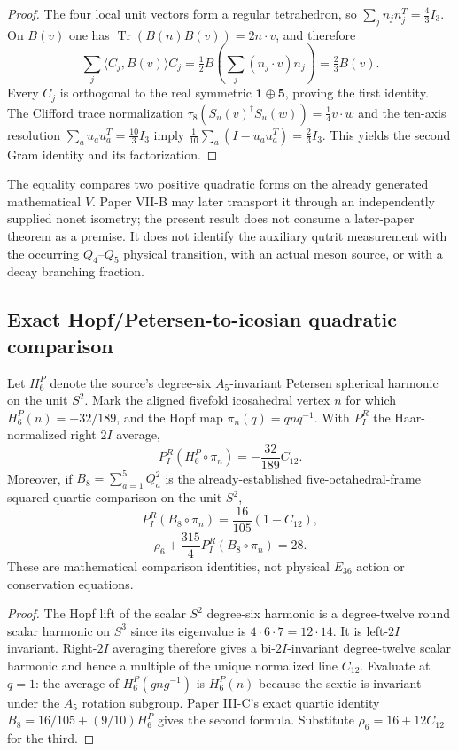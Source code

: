 \documentclass[12pt,a4paper]{article}
\begin{document}
\begin{proof}
The four local unit vectors form a regular tetrahedron, so
$\sum_jn_jn_j^T=\tfrac43I_3$. On $B(v)$ one has
$\operatorname{Tr}(B(n)B(v))=2n\cdot v$, and therefore
\[
 \sum_j\langle C_j,B(v)\rangle C_j
 =\tfrac12 B\!\left(\sum_j(n_j\cdot v)n_j\right)
 =\tfrac23B(v).
\]
Every $C_j$ is orthogonal to the real symmetric $\mathbf1\oplus\mathbf5$,
proving the first identity. The Clifford trace normalization
$\tau_8(S_u(v)^\dagger S_u(w))=\tfrac14v\cdot w$ and the ten-axis
resolution $\sum_au_au_a^T=\tfrac{10}{3}I_3$ imply
$\tfrac1{10}\sum_a(I-u_au_a^T)=\tfrac23I_3$.
This yields the second Gram identity and its factorization.
\end{proof}

\begin{remark}
The equality compares two positive quadratic forms on the already generated
mathematical $V$. Paper VII-B may later transport it through an
independently supplied nonet isometry; the present result does not
consume a later-paper theorem as a premise. It does not identify the auxiliary qutrit
measurement with the occurring $Q_4$--$Q_5$ physical transition,
with an actual meson source, or with a decay branching fraction.
\end{remark}

\subsection{Exact Hopf/Petersen-to-icosian quadratic comparison}
\label{cc19:sec:petersen-hopf-complement}
\begin{theorem}
\label{cc19:thm:petersen-hopf-lift}
Let $H_6^P$ denote the source's degree-six $A_5$-invariant Petersen
spherical harmonic on the unit $S^2$. Mark the aligned fivefold
icosahedral vertex $n$ for which $H_6^P(n)=-32/189$, and the Hopf map
$\pi_n(q)=q n q^{-1}$. With $P_I^R$ the Haar-normalized right
$2I$ average,
\[
\boxed{P_I^R(H_6^P\circ\pi_n)=-\frac{32}{189}C_{12}.}
\]
Moreover, if $B_8=\sum_{a=1}^5Q_a^2$ is the already-established
five-octahedral-frame squared-quartic comparison on the unit $S^2$,
\[
\boxed{P_I^R(B_8\circ\pi_n)=\frac{16}{105}(1-C_{12}),}
\]
\[
\boxed{\rho_6+\frac{315}{4}P_I^R(B_8\circ\pi_n)=28.}
\]
These are mathematical comparison identities, not physical
$E_{36}$ action or conservation equations.
\end{theorem}
\begin{proof}
The Hopf lift of the scalar $S^2$ degree-six harmonic is a degree-twelve
round scalar harmonic on $S^3$ since its eigenvalue is
$4\cdot6\cdot7=12\cdot14$. It is left-$2I$ invariant. Right-$2I$
averaging therefore gives a bi-$2I$-invariant degree-twelve scalar
harmonic and hence a multiple of the unique normalized line $C_{12}$.
Evaluate at $q=1$: the average of $H_6^P(gng^{-1})$ is $H_6^P(n)$
because the sextic is invariant under the $A_5$ rotation subgroup.
Paper III-C's exact quartic identity
$B_8=16/105+(9/10)H_6^P$ gives the second formula.
Substitute $\rho_6=16+12C_{12}$ for the third.
\end{proof}
\end{document}
